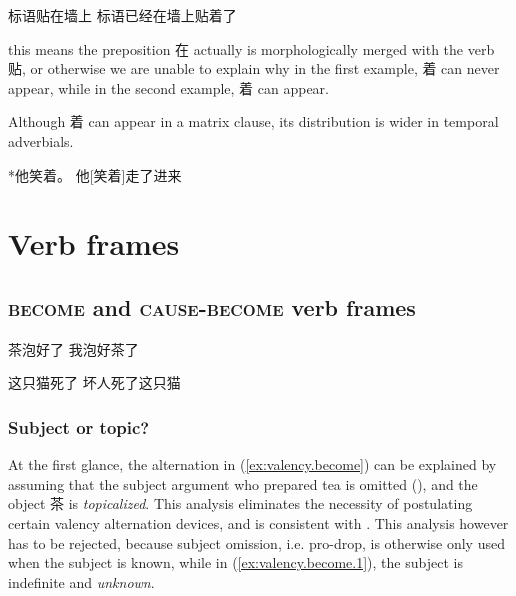 \documentclass[UTF8, a4paper, oneside, scheme=plain, 12pt]{ctexrep}
\newcommand*{\category}[1]{\textsc{#1}}
\begin{document}
\begin{exe}
    \ex 标语贴在墙上 
    \ex 标语已经在墙上贴着了
\end{exe}
 
this means the preposition 在 actually is morphologically merged with the verb 贴, 
or otherwise we are unable to explain why 
in the first example, 着 can never appear, 
while in the second example, 着 can appear.

Although 着 can appear in a matrix clause, 
its distribution is wider in temporal adverbials. 

*他笑着。
他[笑着]走了进来

\chapter{Verb frames}\label{chap:verb-frames}

\section{\category{become} and \category{cause}-\category{become} verb frames}

\begin{exe}
    \ex\label{ex:valency.become} \begin{xlist}
        \ex\label{ex:valency.become.1} 茶泡好了
        \ex 我泡好茶了
    \end{xlist}

    \ex\label{ex:valency.become-only}
    \begin{xlist}
        \ex\label{ex:valency.become-only.1} 这只猫死了
        \ex *坏人死了这只猫
    \end{xlist}
\end{exe}

\subsection{Subject or topic?}\label{sec:valency.become.subject-or-topic}

At the first glance, the alternation in (\ref{ex:valency.become})
can be explained by assuming that the 
subject argument who prepared tea is omitted (),
and the object 茶 is \emph{topicalized}.
This analysis eliminates the necessity of postulating certain valency alternation devices,
and is consistent with \citet{lapolla20091}.
This analysis however has to be rejected,
because subject omission, i.e. pro-drop,
is otherwise only used when the subject is known,
while in (\ref{ex:valency.become.1}),
the subject is indefinite and \emph{unknown}.
\end{document}
